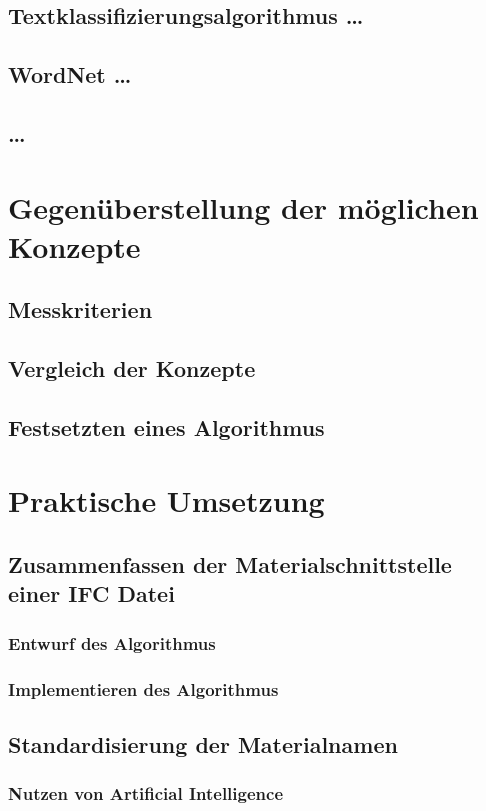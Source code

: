 \subsection{{Textklassifizierungsalgorithmus \dots}}
\subsection{{WordNet \dots}}
\subsection{\dots}

\section{Gegenüberstellung der möglichen Konzepte}
\subsection{Messkriterien}
\subsection{Vergleich der Konzepte}
\subsection{Festsetzten eines Algorithmus}
\section{Praktische Umsetzung}
\subsection{Zusammenfassen der Materialschnittstelle einer IFC Datei}
\subsubsection{Entwurf des Algorithmus}
\subsubsection{Implementieren des Algorithmus}

\subsection{Standardisierung der Materialnamen}
\subsubsection{Nutzen von Artificial Intelligence}

